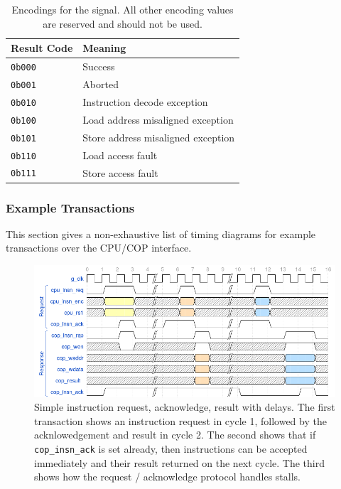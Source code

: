 \documentclass{article}
\begin{document}
\begin{table}[h!]
\centering
\begin{tabular}{ll}
\toprule
{\bf Result Code} & {\bf Meaning} \\
\midrule
 {\tt 0b000}  & Success \\
 {\tt 0b001}  & Aborted \\
 {\tt 0b010}  & Instruction decode exception \\
 {\tt 0b100}  & Load address misaligned exception  \\
 {\tt 0b101}  & Store address misaligned exception \\
 {\tt 0b110}  & Load access fault                  \\
 {\tt 0b111}  & Store access fault                 \\
 \bottomrule
\end{tabular}
\caption{Encodings for the  signal. All other encoding
values are reserved and should not be used.}
\label{tab:cop-result-encodings}
\end{table}

\subsubsection{Example Transactions}

This section gives a non-exhaustive list of timing diagrams for example
transactions over the CPU/COP interface.

\begin{figure}[H]
\centering
\includegraphics[width=\textwidth]{./diagrams/cpu-cop-if-1.png}
\caption{Simple instruction request, acknowledge, result with delays.
The first transaction shows an instruction request in cycle 1, followed
by the acknlowedgement and result in cycle 2.
The second shows that if {\tt cop\_insn\_ack} is set already, then
instructions can be accepted immediately and their result returned on the next
cycle.  The third shows how the request / acknowledge protocol handles
stalls.}
\label{fig:cpu-cop-if-waves-1}
\end{figure}
\end{document}
